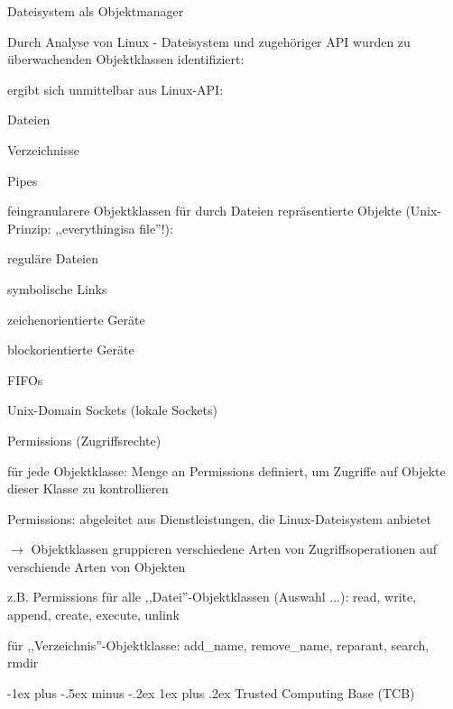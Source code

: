 \documentclass[a4paper]{article}
\makeatletter
\renewcommand{\subsubsection}{\@startsection{subsubsection}{3}{0mm}%
 {-1ex plus -.5ex minus -.2ex}%
 {1ex plus .2ex}%
 {\normalfont\small\bfseries}}
\makeatother
\begin{document}
\begin{multicols}{3}
    Dateisystem als Objektmanager

    \begin{itemize*}
        \item
        Durch Analyse von Linux - Dateisystem und zugehöriger API wurden zu
        überwachenden Objektklassen identifiziert:
        \begin{itemize*}
            \item ergibt sich unmittelbar aus Linux-API: \begin{itemize*} \item Dateien \item Verzeichnisse \item Pipes \end{itemize*}
            \item feingranularere Objektklassen für durch Dateien repräsentierte Objekte (Unix-Prinzip: ,,everythingisa file''!): \begin{itemize*} \item reguläre Dateien \item symbolische Links \item zeichenorientierte Geräte \item blockorientierte Geräte \item FIFOs \item Unix-Domain Sockets (lokale Sockets) \end{itemize*}
        \end{itemize*}
        \item
        Permissions (Zugriffsrechte)
        \item
        für jede Objektklasse: Menge an Permissions definiert, um Zugriffe auf
        Objekte dieser Klasse zu kontrollieren
        \item
        Permissions: abgeleitet aus Dienstleistungen, die Linux-Dateisystem
        anbietet
        \item
        $\rightarrow$ Objektklassen gruppieren verschiedene
        Arten von Zugriffsoperationen auf verschiende Arten von Objekten
        \item
        z.B. Permissions für alle ,,Datei''-Objektklassen (Auswahl ...): read,
        write, append, create, execute, unlink
        \item
        für ,,Verzeichnis''-Objektklasse: add\_name, remove\_name, reparant,
        search, rmdir
    \end{itemize*}


    \subsubsection{Trusted Computing Base
        (TCB)}


\end{multicols}
\end{document}
